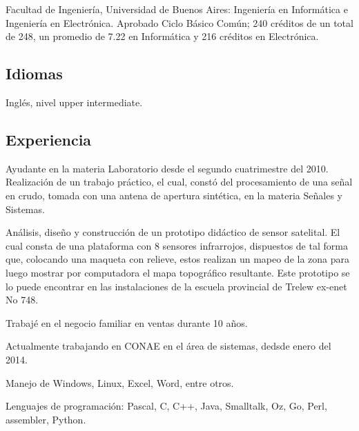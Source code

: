 \documentclass[a4paper,10pt]{article}
\begin{document}
Facultad de Ingeniería, Universidad de Buenos Aires: Ingeniería en Informática e
Ingeniería en Electrónica. Aprobado Ciclo Básico Común; 240 créditos de un total
de 248, un promedio de 7.22 en Informática y 216 créditos en Electrónica.


\subsection*{Idiomas}
    Inglés, nivel upper intermediate.

\subsection*{Experiencia}
Ayudante en la materia Laboratorio desde el segundo cuatrimestre del 2010.
Realización de un trabajo práctico, el cual, constó del procesamiento de una 
señal en crudo, tomada con una antena de apertura sintética, en la materia 
Señales y Sistemas.

Análisis, diseño y construcción de un prototipo didáctico de sensor satelital. 
El cual consta de una plataforma con 8 sensores infrarrojos, dispuestos de tal 
forma que, colocando una maqueta con relieve, estos realizan un mapeo de la 
zona para luego mostrar por computadora el mapa topográfico resultante. Este 
prototipo se lo puede encontrar en las instalaciones de la escuela provincial 
de Trelew ex-enet No 748.

Trabajé en el negocio familiar en ventas durante 10 años.

Actualmente trabajando en CONAE en el área de sistemas, dedsde enero del 2014.

Manejo de Windows, Linux, Excel, Word, entre otros.

Lenguajes de programación: Pascal, C, C++, Java, Smalltalk, Oz, Go, Perl,
assembler, Python.

\newpage
\end{document}
